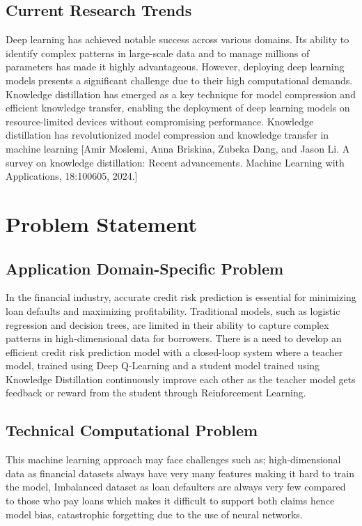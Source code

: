 \documentclass[8pt]{article}
\begin{document}
\subsection{Current Research Trends}
Deep learning has achieved notable success across various domains. Its ability to identify complex patterns in large-scale data and to manage millions of parameters has made it highly advantageous. However, deploying deep learning models presents a significant challenge due to their high computational demands. Knowledge distillation has emerged as a key technique for model compression and efficient knowledge transfer, enabling the deployment of deep learning models on resource-limited devices without compromising performance.
Knowledge distillation has revolutionized model compression and knowledge transfer in machine learning [Amir Moslemi, Anna Briskina, Zubeka Dang, and Jason Li. A survey
on knowledge distillation: Recent advancements. Machine Learning with
Applications, 18:100605, 2024.]

\section{Problem Statement
}
\subsection{Application Domain-Specific Problem}
In the financial industry, accurate credit risk prediction is essential for minimizing loan defaults and maximizing profitability. Traditional models, such as logistic regression and decision trees, are limited in their ability to capture complex patterns in high-dimensional data for borrowers. There is a need to develop an efficient credit risk prediction model  with a closed-loop system where a teacher model, trained using Deep Q-Learning and a student model trained using Knowledge Distillation continuously improve each other as the teacher model gets feedback or reward from the student through Reinforcement Learning. 
\subsection{Technical Computational Problem}
This machine learning approach may face challenges such as; high-dimensional data as financial datasets always have very many features making it hard to train the model, Imbalanced dataset as loan defaulters are always very few compared to those who pay loans which makes it difficult to support both claims hence model bias, catastrophic forgetting due to the use of neural networks.
\end{document}
